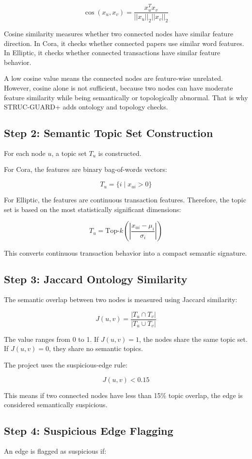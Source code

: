 \documentclass[12pt,a4paper]{article}
\begin{document}
$$
\cos(x_u,x_v)=\frac{x_u^Tx_v}{||x_u||_2||x_v||_2}
$$

Cosine similarity measures whether two connected nodes have similar feature direction. In Cora, it checks whether connected papers use similar word features. In Elliptic, it checks whether connected transactions have similar feature behavior.

A low cosine value means the connected nodes are feature-wise unrelated. However, cosine alone is not sufficient, because two nodes can have moderate feature similarity while being semantically or topologically abnormal. That is why STRUC-GUARD+ adds ontology and topology checks.

\subsection{Step 2: Semantic Topic Set Construction}
For each node $u$, a topic set $T_u$ is constructed.

For Cora, the features are binary bag-of-words vectors:

$$
T_u=\{i\mid x_{ui}>0\}
$$

For Elliptic, the features are continuous transaction features. Therefore, the topic set is based on the most statistically significant dimensions:

$$
T_u=\text{Top-}k\left(\left|\frac{x_{ui}-\mu_i}{\sigma_i}\right|\right)
$$

This converts continuous transaction behavior into a compact semantic signature.

\subsection{Step 3: Jaccard Ontology Similarity}
The semantic overlap between two nodes is measured using Jaccard similarity:

$$
J(u,v)=\frac{|T_u\cap T_v|}{|T_u\cup T_v|}
$$

The value ranges from 0 to 1. If $J(u,v)=1$, the nodes share the same topic set. If $J(u,v)=0$, they share no semantic topics.

The project uses the suspicious-edge rule:

$$
J(u,v)<0.15
$$

This means if two connected nodes have less than 15\% topic overlap, the edge is considered semantically suspicious.

\subsection{Step 4: Suspicious Edge Flagging}
An edge is flagged as suspicious if:
\end{document}
